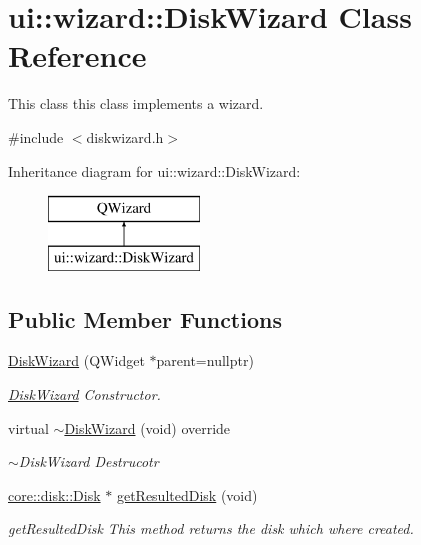 \hypertarget{classui_1_1wizard_1_1_disk_wizard}{}\section{ui\+:\+:wizard\+:\+:Disk\+Wizard Class Reference}
\label{classui_1_1wizard_1_1_disk_wizard}


This class this class implements a wizard.  




{\ttfamily \#include $<$diskwizard.\+h$>$}

Inheritance diagram for ui\+:\+:wizard\+:\+:Disk\+Wizard\+:\begin{figure}[H]
\begin{center}
\leavevmode
\includegraphics[height=2.000000cm]{classui_1_1wizard_1_1_disk_wizard}
\end{center}
\end{figure}
\subsection*{Public Member Functions}
\begin{DoxyCompactItemize}
\item 
\mbox{\hyperlink{classui_1_1wizard_1_1_disk_wizard_a728f3938ee8a8f44cef12158b6e6ab1f}{Disk\+Wizard}} (Q\+Widget $\ast$parent=nullptr)
\begin{DoxyCompactList}\small\item\em \mbox{\hyperlink{classui_1_1wizard_1_1_disk_wizard}{Disk\+Wizard}} Constructor. \end{DoxyCompactList}\item 
\mbox{\label{classui_1_1wizard_1_1_disk_wizard_a9376442c638a808b79a27be0379f83c2}} 
virtual \mbox{\hyperlink{classui_1_1wizard_1_1_disk_wizard_a9376442c638a808b79a27be0379f83c2}{$\sim$\+Disk\+Wizard}} (void) override
\begin{DoxyCompactList}\small\item\em $\sim$\+Disk\+Wizard Destrucotr \end{DoxyCompactList}\item 
\mbox{\hyperlink{classcore_1_1disk_1_1_disk}{core\+::disk\+::\+Disk}} $\ast$ \mbox{\hyperlink{classui_1_1wizard_1_1_disk_wizard_ae62aaaaa962e9cac555928bf84579e8f}{get\+Resulted\+Disk}} (void)
\begin{DoxyCompactList}\small\item\em get\+Resulted\+Disk This method returns the disk which where created. \end{DoxyCompactList}\end{DoxyCompactItemize}
